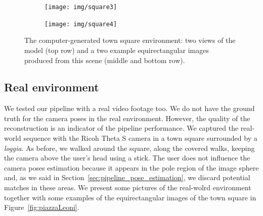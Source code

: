 \begin{figure}
\begin{subfigure}{0.4\textwidth}
	\end{subfigure}
	\begin{subfigure}{0.8\textwidth}
		\centering
		\texttt{[image: img/square3]}
	\end{subfigure}
	\begin{subfigure}{0.8\textwidth}
		\centering
		\texttt{[image: img/square4]}
	\end{subfigure}
	\caption{The computer-generated town square environment: two views of the
	model (top row) and a two example equirectangular images produced from this
	scene (middle and bottom row).}
    \label{fig:test_square}
\end{figure}

\subsection{Real environment}\label{subsec:real_environment}
We tested our pipeline with a real video footage too. We do not have the ground truth
for the camera poses in the real environment. However, the quality of the
reconstruction is an indicator of the pipeline performance.
We captured the real-world sequence with the Ricoh Theta S camera in a town square
surrounded by a \emph{loggia}. As before, we walked around the square, along the covered
walks, keeping the camera above the user's head using a stick.
The user does not influence the camera poses estimation because it appears in the
pole region of the image sphere and, as we said in
Section~\ref{sec:pipeline_pose_estimation}, we discard potential matches in
these areas.
We present some pictures of the real-wolrd environment together with some examples
of the equirectangular images of the town square in
Figure~\ref{fig:piazzaLeoni}.
%

